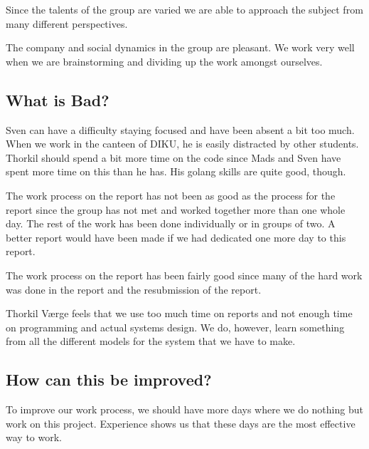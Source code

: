 \documentclass[11pt,a4paper]{report}
\begin{document}
Since the talents of the group are varied we are able to approach the subject from many different perspectives.

The company and social dynamics in the group are pleasant. We work very well when we are brainstorming and dividing up the work amongst ourselves.

\subsection{What is Bad?}
Sven can have a difficulty staying focused and have been absent a bit too much. When we work in the canteen of DIKU, he is easily distracted by other students. Thorkil should spend a bit more time on the code since Mads and Sven have spent more time on this than he has. His golang skills are quite good, though. 

The work process on the  report has not been as good as the process for the  report since the group has not met and worked together more than one whole day. The rest of the work has been done individually or in groups of two. A better report would have been made if we had dedicated one more day to this report.

The work process on the  report has been fairly good since many of the hard work was done in the  report and the resubmission of the  report.

Thorkil Værge feels that we use too much time on reports and not enough time on programming and actual systems design. We do, however, learn something from all the different models for the system that we have to make.

\subsection{How can this be improved?}
To improve our work process, we should have more days where we do nothing but work on this project. Experience shows us that these days are the most effective way to work.
\end{document}
